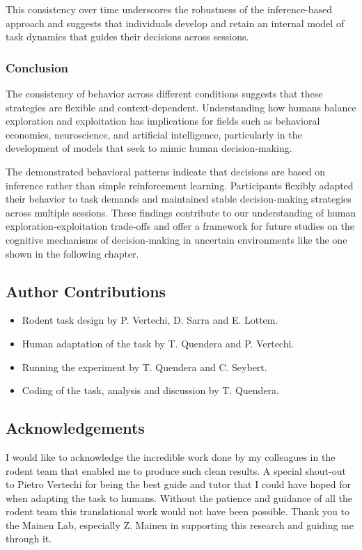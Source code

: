 \documentclass[11pt]{article}
\begin{document}
This consistency over time underscores the robustness of the inference-based approach and suggests that individuals develop and retain an internal model of task dynamics that guides their decisions across sessions.

\subsubsection{Conclusion}

The consistency of behavior across different conditions suggests that these strategies are flexible and context-dependent. Understanding how humans balance exploration and exploitation has implications for fields such as behavioral economics, neuroscience, and artificial intelligence, particularly in the development of models that seek to mimic human decision-making.

The demonstrated behavioral patterns indicate that decisions are based on inference rather than simple reinforcement learning. Participants flexibly adapted their behavior to task demands and maintained stable decision-making strategies across multiple sessions. These findings contribute to our understanding of human exploration-exploitation trade-offs and offer a framework for future studies on the cognitive mechanisms of decision-making in uncertain environments like the one shown in the following chapter.


\subsection{Author Contributions}

\begin{itemize}
    \item Rodent task design by P. Vertechi, D. Sarra and E. Lottem.
    \item Human adaptation of the task by T. Quendera and P. Vertechi.
    \item Running the experiment by T. Quendera and C. Seybert.
    \item Coding of the task, analysis and discussion by T. Quendera.
\end{itemize}

\subsection{Acknowledgements}

I would like to acknowledge the incredible work done by my colleagues in the rodent team that enabled me to produce such clean results. A special shout-out to Pietro Vertechi for being the best guide and tutor that I could have hoped for when adapting the task to humans. Without the patience and guidance of all the rodent team this translational work would not have been possible. Thank you to the Mainen Lab, especially Z. Mainen in supporting this research and guiding me through it.
\end{document}
